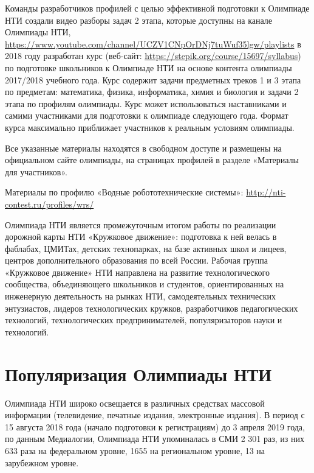 Команды разработчиков профилей с целью эффективной подготовки к Олимпиаде НТИ создали видео разборы задач 2 этапа, которые доступны на канале Олимпиады НТИ, \url{https://www.youtube.com/channel/UCZV1CNpOrDNj7tuWuf35lgw/playlists} в 2018 году разработан курс (веб-сайт: \url{https://stepik.org/course/15697/syllabus}) по подготовке школьников к Олимпиаде НТИ на основе контента олимпиады 2017/2018 учебного года. Курс содержит задачи предметных треков 1 и 3 этапа по предметам: математика, физика, информатика, химия и биология и задачи 2 этапа по профилям олимпиады. Курс может использоваться наставниками и самими участниками для подготовки к олимпиаде следующего года. Формат курса максимально приближает участников к реальным условиям олимпиады.

Все указанные материалы находятся в свободном доступе и размещены на официальном сайте олимпиады, на страницах профилей в разделе «Материалы для участников». 

Материалы по профилю «Водные робототехнические системы»: \url{http://nti-contest.ru/profiles/wrs/}

Олимпиада НТИ является промежуточным итогом работы по реализации дорожной карты НТИ «Кружковое движение»: подготовка к ней велась в фаблабах, ЦМИТах, детских технопарках, на базе активных школ и лицеев, центров дополнительного образования по всей России. Рабочая группа «Кружковое движение» НТИ направлена на развитие технологического сообщества, объединяющего школьников и студентов, ориентированных на инженерную деятельность на рынках НТИ, самодеятельных технических энтузиастов, лидеров технологических кружков, разработчиков педагогических технологий, технологических предпринимателей, популяризаторов науки и технологий.

\section*{Популяризация Олимпиады НТИ}

Олимпиада НТИ широко освещается в различных средствах массовой информации (телевидение, печатные издания, электронные издания). В период с 15 августа 2018 года (начало подготовки к регистрациям) до 3 апреля 2019 года, по данным Медиалогии, Олимпиада НТИ упоминалась в СМИ 2 301 раз, из них 633 раза на федеральном уровне, 1655 на региональном уровне, 13 на зарубежном уровне. 


